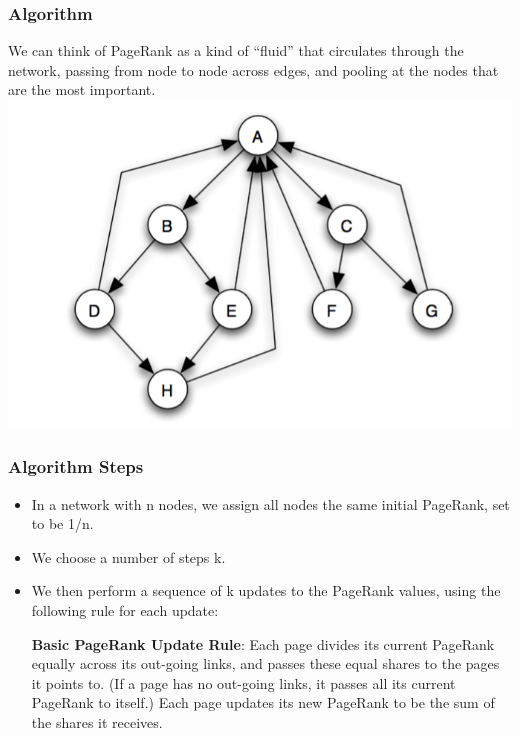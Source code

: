 \documentclass{beamer}
\begin{document}
\begin{frame}
\frametitle{Algorithm}
We can think of PageRank as a kind of “fluid” that circulates through the network, passing from node to node across edges, and pooling at the nodes that are the most important.
\center
\includegraphics[scale=0.3]{img/general_network.png} 
\end{frame}


\begin{frame}
\frametitle{Algorithm Steps}
\begin{itemize}
\item {} In a network with n nodes, we assign all nodes the same initial PageRank, set to be 1/n.
\item {} We choose a number of steps k.
\item {} We then perform a sequence of k updates to the PageRank values, using the following
rule for each update:\\
\begin{adjustwidth}{2.5em}{0pt}
\textbf{Basic PageRank Update Rule}: Each page divides its current PageRank equally across its out-going links, and passes these equal shares to the pages it points to. (If a page has no out-going links, it passes all its current PageRank to itself.) Each page updates its new PageRank to be the sum of the shares it receives.
\end{adjustwidth}
\end{itemize}
\end{frame}
\end{document}
